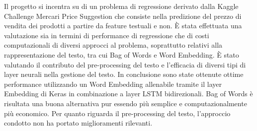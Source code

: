 
Il progetto si incentra su di un problema di regressione derivato dalla Kaggle
Challenge Mercari Price Suggestion che consiste nella predizione del prezzo di
vendita dei prodotti a partire da feature testuali e non. È stata effettuata una
valutazione sia in termini di performance di regressione che di costi
computazionali di diversi approcci al problema, soprattutto relativi alla
rappresentazione del testo, tra cui Bag of Words e Word Embedding. È stato
valutando il contributo del pre-processing del testo e l'efficacia di diversi
tipi di layer neurali nella gestione del testo. In conclusione sono state
ottenute ottime performance utilizzando un Word Embedding allenabile tramite il
layer Embedding di Keras in combinazione a layer LSTM bidirezionali. Bag of
Words è risultata una buona alternativa pur essendo più semplice e
computazionalmente più economico. Per quanto riguarda il pre-processing del
testo, l'approccio condotto non ha portato miglioramenti rilevanti.